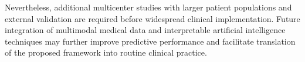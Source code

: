 \documentclass[12pt]{article}
\begin{document}
Nevertheless, additional multicenter studies with larger patient populations and external validation are required before widespread clinical implementation. Future integration of multimodal medical data and interpretable artificial intelligence techniques may further improve predictive performance and facilitate translation of the proposed framework into routine clinical practice. 

 

\end{document}
